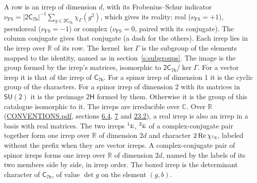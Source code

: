 \documentclass[10pt,a4paper]{article}
\numberwithin{equation}{section}
\newcommand{\grp}[1]{\mathsf{#1}}
\newcommand{\irr}[1]{\text{\normalfont\scshape #1}}
\newcommand{\conjpair}[1]{{}^{#1}}
\newcommand{\irchar}[1]{\chi_{#1}}
\newcommand{\fsind}{\nu_{\mathrm{FS}}}
\begin{document}
\leavevmode\label{n:index.frobenius}\label{n:head.irrep}\label{n:head.reality}A row is an irrep of dimension $d$, with its Frobenius--Schur indicator $\fsind = |\grp{2C_{7h}}|^{-1}\allowbreak\sum_{g\in\grp{2C_{7h}}}\irchar{\Gamma}(g^2)$, which gives its reality: real ($\fsind = +1$), pseudoreal ($\fsind = -1$) or complex ($\fsind = 0$, paired with its conjugate). \label{n:head.conjugate}The column conjugate gives that conjugate (a dash for the others). \label{n:head.over.real}Each irrep lies in the irrep over $\mathbb{R}$ of its row. \label{n:head.kernel}The kernel $\ker\Gamma$ is the subgroup of the elements mapped to the identity, named as in section~\ref{s:subgroups}. \label{n:head.image}The image is the group formed by the irrep's matrices, isomorphic to $\grp{2C_{7h}}/\ker\Gamma$. For a vector irrep it is that of the irrep of \href{../../../rotation/data/pdf/C7h.pdf}{$\grp{C_{7h}}$}. For a spinor irrep of dimension 1 it is the cyclic group of the characters. For a spinor irrep of dimension 2 with its matrices in $\grp{SU(2)}$ it is the preimage $\grp{2H}$ formed by them. Otherwise it is the group of this catalogue isomorphic to it. The irreps are irreducible over $\mathbb{C}$. Over $\mathbb{R}$ (\href{../../CONVENTIONS.pdf}{CONVENTIONS.pdf}, sections \href{../../../rotation/CONVENTIONS.pdf\#conv.6.4}{6.4}, \href{../../../rotation/CONVENTIONS.pdf\#conv.7}{7} and \href{../../CONVENTIONS.pdf\#conv.23.2}{23.2}), a real irrep is also an irrep in a basis with real matrices. The two irreps $\conjpair{1}\irr{e}$, $\conjpair{2}\irr{e}$ of a complex-conjugate pair together form one irrep over $\mathbb{R}$ of dimension $2d$ and character $2\operatorname{Re}\irchar{\conjpair{1}\irr{e}}$, labeled without the prefix when they are vector irreps. A complex-conjugate pair of spinor irreps forms one irrep over $\mathbb{R}$ of dimension $2d$, named by the labels of its two members side by side, in irrep order. \label{n:mark.determinant}The boxed irrep is the determinant character of \href{../../../rotation/data/pdf/C7h.pdf}{$\grp{C_{7h}}$}, of value $\det g$ on the element $(g, b)$.
\setlength{\emergencystretch}{2em}\par\setlength{\emergencystretch}{0pt}
\end{document}
